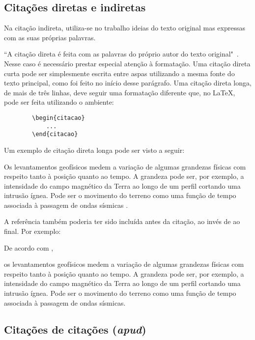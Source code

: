     \subsection*{Citações diretas e indiretas}
    
    Na citação indireta, utiliza-se no trabalho ideias do texto original mas expressas com as suas próprias palavras.
    
    ``A citação direta é feita com as palavras do próprio autor do texto original"\ \cite{citacoes}. Nesse caso é necessário prestar especial atenção à formatação. Uma citação direta curta pode ser simplesmente escrita entre aspas utilizando a mesma fonte do texto principal, como foi feito no início desse parágrafo. Uma citação direta longa, de mais de três linhas, deve seguir uma formatação diferente que, no \LaTeX, pode ser feita utilizando o ambiente:
    \begin{verbatim}
        \begin{citacao}
            ...
        \end{citacao}
    \end{verbatim}
    
    Um exemplo de citação direta longa pode ser visto a seguir:
    \begin{citacao}
    Os levantamentos geofísicos medem a variação de algumas grandezas físicas com respeito tanto à posição quanto ao tempo. A grandeza pode ser, por exemplo, a intensidade do campo magnético da Terra ao longo de um perfil cortando uma intrusão ígnea. Pode ser o movimento do terreno como uma função de tempo associada à passagem de ondas sísmicas \cite{kearey2009}.
    \end{citacao}
    
    A referência também poderia ter sido incluída antes da citação, ao invés de ao final. Por exemplo:
    
    De acordo com ,
    \begin{citacao}
    os levantamentos geofísicos medem a variação de algumas grandezas físicas com respeito tanto à posição quanto ao tempo. A grandeza pode ser, por exemplo, a intensidade do campo magnético da Terra ao longo de um perfil cortando uma intrusão ígnea. Pode ser o movimento do terreno como uma função de tempo associada à passagem de ondas sísmicas.
    \end{citacao}
    
    \subsection*{Citações de citações (\textit{apud})}
    

